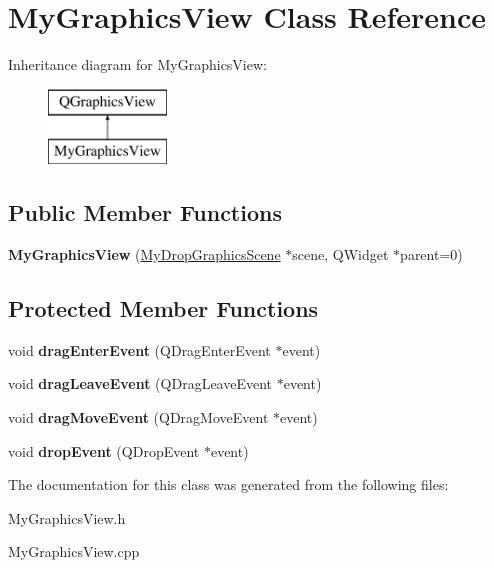 \hypertarget{class_my_graphics_view}{}\section{My\+Graphics\+View Class Reference}
\label{class_my_graphics_view}
Inheritance diagram for My\+Graphics\+View\+:\begin{figure}[H]
\begin{center}
\leavevmode
\includegraphics[height=2.000000cm]{class_my_graphics_view}
\end{center}
\end{figure}
\subsection*{Public Member Functions}
\begin{DoxyCompactItemize}
\item 
\hypertarget{class_my_graphics_view_a7236beae467bc43ed9f88222b25d4874}{}{\bfseries My\+Graphics\+View} (\hyperlink{class_my_drop_graphics_scene}{My\+Drop\+Graphics\+Scene} $\ast$scene, Q\+Widget $\ast$parent=0)\label{class_my_graphics_view_a7236beae467bc43ed9f88222b25d4874}

\end{DoxyCompactItemize}
\subsection*{Protected Member Functions}
\begin{DoxyCompactItemize}
\item 
\hypertarget{class_my_graphics_view_a22dd9a814c979d818ab322706f0b9297}{}void {\bfseries drag\+Enter\+Event} (Q\+Drag\+Enter\+Event $\ast$event)\label{class_my_graphics_view_a22dd9a814c979d818ab322706f0b9297}

\item 
\hypertarget{class_my_graphics_view_a7c1982f74cf31f7d2b5721e16ed5587a}{}void {\bfseries drag\+Leave\+Event} (Q\+Drag\+Leave\+Event $\ast$event)\label{class_my_graphics_view_a7c1982f74cf31f7d2b5721e16ed5587a}

\item 
\hypertarget{class_my_graphics_view_a3c475cb56178cd729b97fce19008ffe9}{}void {\bfseries drag\+Move\+Event} (Q\+Drag\+Move\+Event $\ast$event)\label{class_my_graphics_view_a3c475cb56178cd729b97fce19008ffe9}

\item 
\hypertarget{class_my_graphics_view_a26906e53c7aa71c8ade8067e98de90b3}{}void {\bfseries drop\+Event} (Q\+Drop\+Event $\ast$event)\label{class_my_graphics_view_a26906e53c7aa71c8ade8067e98de90b3}

\end{DoxyCompactItemize}


The documentation for this class was generated from the following files\+:\begin{DoxyCompactItemize}
\item 
My\+Graphics\+View.\+h\item 
My\+Graphics\+View.\+cpp\end{DoxyCompactItemize}
